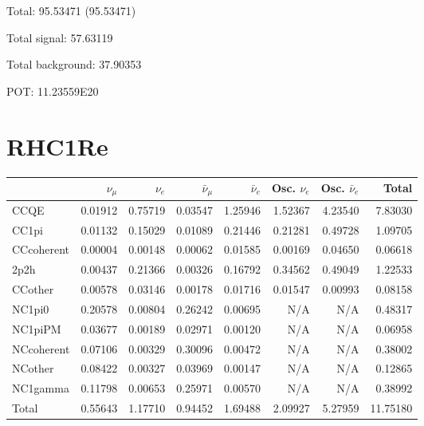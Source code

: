 \documentclass[10pt,a4paper]{article}
\begin{document}
Total: 95.53471    (95.53471)


Total signal: 57.63119


Total background: 37.90353

POT: 11.23559E20


\section*{RHC1Re}
\begin{tabular} { | l ||r | r | r | r | r | r | | r | }
\hline
              & $\nu_\mu$            & $\nu_e$              & $\bar{\nu}_{\mu}$    & $\bar{\nu}_{e}$      & Osc. $\nu_e$         & Osc. $\bar{\nu}_{e}$ & Total                \\ \hline\hline
 CCQE         & 0.01912              & 0.75719              & 0.03547              & 1.25946              & 1.52367              & 4.23540              & 7.83030              \\ \hline
 CC1pi        & 0.01132              & 0.15029              & 0.01089              & 0.21446              & 0.21281              & 0.49728              & 1.09705              \\ \hline
 CCcoherent   & 0.00004              & 0.00148              & 0.00062              & 0.01585              & 0.00169              & 0.04650              & 0.06618              \\ \hline
 2p2h         & 0.00437              & 0.21366              & 0.00326              & 0.16792              & 0.34562              & 0.49049              & 1.22533              \\ \hline
 CCother      & 0.00578              & 0.03146              & 0.00178              & 0.01716              & 0.01547              & 0.00993              & 0.08158              \\ \hline
 NC1pi0       & 0.20578              & 0.00804              & 0.26242              & 0.00695              & N/A                  & N/A                  & 0.48317              \\ \hline
 NC1piPM      & 0.03677              & 0.00189              & 0.02971              & 0.00120              & N/A                  & N/A                  & 0.06958              \\ \hline
 NCcoherent   & 0.07106              & 0.00329              & 0.30096              & 0.00472              & N/A                  & N/A                  & 0.38002              \\ \hline
 NCother      & 0.08422              & 0.00327              & 0.03969              & 0.00147              & N/A                  & N/A                  & 0.12865              \\ \hline
 NC1gamma     & 0.11798              & 0.00653              & 0.25971              & 0.00570              & N/A                  & N/A                  & 0.38992              \\ \hline
\hline
 Total        & 0.55643              & 1.17710              & 0.94452              & 1.69488              & 2.09927              & 5.27959              & 11.75180             \\ \hline

\end{tabular}
\end{document}
